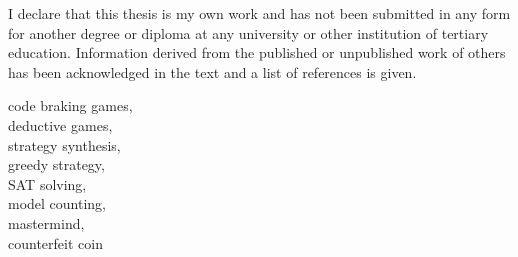 








\FrontMatter
\setlength{\parindent}{0pt}
\ThesisTitlePage


\begin{ThesisDeclaration}
I declare that this thesis is my own work and has not been submitted
in any form for another degree or diploma at any university or
other institution of tertiary education. Information derived from the published
or unpublished work of others has been acknowledged in the text
and a list of references is given.

\AdvisorName
\end{ThesisDeclaration}




\begin{ThesisKeyWords}
code braking games, \\
deductive games,\\
strategy synthesis, \\
greedy strategy,\\
SAT solving,\\
model counting, \\
mastermind, \\
counterfeit coin\\
\end{ThesisKeyWords}


